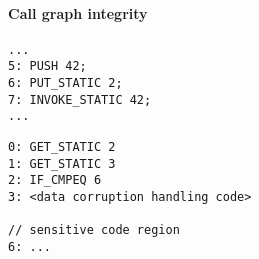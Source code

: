 \paragraph{Call graph integrity}
\begin{minipage}{\linewidth}
\begin{lstlisting}[caption={Caller with call graph integrity implemented. The code is written in \jcl. Note that for simplicity, the numbers in the left side are line numbers and do not denote the program counter values.}, label={lst:dupCall0}]
...
5: PUSH 42; 
6: PUT_STATIC 2;
7: INVOKE_STATIC 42;
...
\end{lstlisting}
\end{minipage}

\begin{minipage}{\linewidth}
\begin{lstlisting}[caption={Callee with call graph integrity implemented. The code is written in \jcl. Note that for simplicity, the numbers in the left side are line numbers and do not denote the program counter values.}, label={lst:dupCall0}]
0: GET_STATIC 2
1: GET_STATIC 3
2: IF_CMPEQ 6
3: <data corruption handling code>

// sensitive code region
6: ...
\end{lstlisting}
\end{minipage}